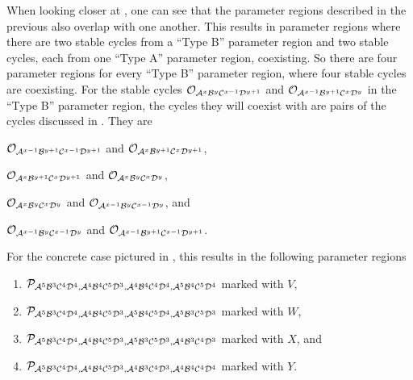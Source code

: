 When looking closer at , one can see that the parameter regions described in the previous  also overlap with one another.
This results in parameter regions where there are two stable cycles from a ``Type B'' parameter region and two stable cycles, each from one ``Type A'' parameter region, coexisting.
So there are four parameter regions for every ``Type B'' parameter region, where four stable cycles are coexisting.
For the stable cycles $\Cycle{\A^x\B^y\C^{x-1}\D^{y+1}}$ and $\Cycle{\A^{x-1}\B^{y+1}\C^x\D^y}$ in the ``Type B'' parameter region, the cycles they will coexist with are pairs of the cycles discussed in .
They are
\begin{enumerate*}
    \item $\Cycle{\A^{x-1}\B^{y+1}\C^{x-1}\D^{y+1}}$ and $\Cycle{\A^x\B^{y+1}\C^x\D^{y+1}}$,
    \item $\Cycle{\A^x\B^{y+1}\C^x\D^{y+1}}$ and $\Cycle{\A^x\B^y\C^x\D^y}$,
    \item $\Cycle{\A^x\B^y\C^x\D^y}$ and $\Cycle{\A^{x-1}\B^y\C^{x-1}\D^y}$, and
    \item $\Cycle{\A^{x-1}\B^y\C^{x-1}\D^y}$ and $\Cycle{\A^{x-1}\B^{y+1}\C^{x-1}\D^{y+1}}$.
\end{enumerate*}
For the concrete case pictured in , this results in the following parameter regions
\begin{enumerate}
    \item $\P_{\A^5\B^3\C^4\D^4, \A^4\B^4\C^5\D^3, \A^4\B^4\C^4\D^4, \A^5\B^4\C^5\D^4}$ marked with $V$,
    \item $\P_{\A^5\B^3\C^4\D^4, \A^4\B^4\C^5\D^3, \A^5\B^4\C^5\D^4, \A^5\B^3\C^5\D^3}$ marked with $W$,
    \item $\P_{\A^5\B^3\C^4\D^4, \A^4\B^4\C^5\D^3, \A^5\B^3\C^5\D^3, \A^4\B^3\C^4\D^3}$ marked with $X$, and
    \item $\P_{\A^5\B^3\C^4\D^4, \A^4\B^4\C^5\D^3, \A^4\B^3\C^4\D^3, \A^4\B^4\C^4\D^4}$ marked with $Y$.
\end{enumerate}

